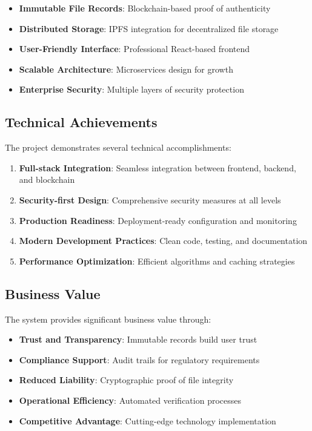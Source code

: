 \documentclass[11pt,a4paper]{article}
\begin{document}
\begin{itemize}
    \item \textbf{Immutable File Records}: Blockchain-based proof of authenticity
    \item \textbf{Distributed Storage}: IPFS integration for decentralized file storage
    \item \textbf{User-Friendly Interface}: Professional React-based frontend
    \item \textbf{Scalable Architecture}: Microservices design for growth
    \item \textbf{Enterprise Security}: Multiple layers of security protection
\end{itemize}

\subsection{Technical Achievements}
The project demonstrates several technical accomplishments:

\begin{enumerate}
    \item \textbf{Full-stack Integration}: Seamless integration between frontend, backend, and blockchain
    \item \textbf{Security-first Design}: Comprehensive security measures at all levels
    \item \textbf{Production Readiness}: Deployment-ready configuration and monitoring
    \item \textbf{Modern Development Practices}: Clean code, testing, and documentation
    \item \textbf{Performance Optimization}: Efficient algorithms and caching strategies
\end{enumerate}

\subsection{Business Value}
The system provides significant business value through:

\begin{itemize}
    \item \textbf{Trust and Transparency}: Immutable records build user trust
    \item \textbf{Compliance Support}: Audit trails for regulatory requirements
    \item \textbf{Reduced Liability}: Cryptographic proof of file integrity
    \item \textbf{Operational Efficiency}: Automated verification processes
    \item \textbf{Competitive Advantage}: Cutting-edge technology implementation
\end{itemize}
\end{document}
